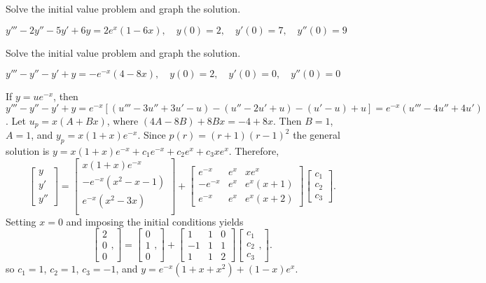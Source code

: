 \documentclass{ximera}
\begin{document}
\begin{problem}\label{exer:9.3.69} Solve the initial value problem and graph the solution.

$y'''-2y''-5y'+6y=2e^x(1-6x),\quad
y(0)=2,
\quad y'(0)=7,\quad y''(0)=9$
\end{problem}

\begin{problem}\label{exer:9.3.70} Solve the initial value problem and graph the solution.

$y'''-y''-y'+y=-e^{-x}(4-8x),\quad
y(0)=2,
\quad y'(0)=0,\quad y''(0)=0$

\begin{solution}
If $y=ue^{-x}$, then $y'''-y''-y'+y=e^{-x}[
(u'''-3u''+3u'-u) -(u''-2u'+u) -(u'-u) +u]
=e^{-x}(u'''-4u''+4u')$. Let $u_p=x(A+Bx)$, where
$(4A-8B)+8Bx=-4+8x$. Then $B=1$,
 $A=1$, and $y_p=x(1+x)e^{-x}$. Since $p(r)=(r+1)(r-1)^2$
the general solution is
 $y=x(1+x)e^{-x}+c_1e^{-x}+c_2e^x+c_3xe^x$.
 Therefore,
$$
\left[\begin{array}{l}y\\y'\\y''\end{array}\right]=
\left[\begin{array}{c}
x(1+x)e^{-x}\\
-e^{-x}(x^2-x-1)\\
e^{-x}(x^2-3x)\\
\end{array}\right]+
\left[\begin{array}{rcc}e^{-x}&e^x&xe^x\\
-e^{-x}&e^x&e^x(x+1)\\e^{-x}&e^x&e^x(x+2)\end{array}\right]
\left[\begin{array}{c}
c_1\\
c_2\\
c_3
\end{array}
\right].
$$
Setting $x=0$ and imposing the initial conditions yields
$$
\left[\begin{array}{c}
2\\
0\\
0
\end{array},
\right]=\left[\begin{array}{c}
0\\
1\\
0
\end{array},
\right]+
\left[\begin{array}{rcc}1&1&0\\-1&1&1\\1&1&2\end{array}\right]
\left[\begin{array}{c}
c_1\\
c_2\\
c_3
\end{array},
\right].
$$
so $c_1=1$, $c_2=1$, $c_3=-1$, and
 $y=e^{-x}(1+x+x^2) +(1-x)e^x$.
\end{solution}
\end{problem}
\end{document}

